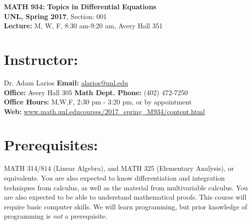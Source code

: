 \documentclass[margin]{res}
\theoremstyle{plain}
\theoremstyle{definition}
\theoremstyle{remark}
\begin{document}
\begin{center}
   \textbf{MATH 934:} 
   \textbf{Topics in Differential Equations}\\
   \textbf{UNL, Spring 2017}, Section: 001%
    \\
   \textbf{Lecture:} M, W, F, 8:30 am-9:20 am, Avery Hall 351\\
\end{center}
%
\vspace{-0.2in}
%
\begin{resume}
\section{Instructor:} Dr. Adam Larios 
\hfill \textbf{Email:} 
\url{alarios@unl.edu}
\\
\textbf{Office:} Avery Hall 305
\hfill
\textbf{Math Dept. Phone:} (402) 472-7250
\\
\textbf{Office Hours:} M,W,F, 2:30 pm - 3:20 pm, or by appointment
\hfill
\\
\textbf{Web:} \url{www.math.unl.educourses/2017_spring_M934/content.html}



 \section{Prerequisites:} MATH 314/814 (Linear Algebra), and MATH 325 (Elementary Analysis), or equivalents.  You are also expected to know differentiation and integration techniques from calculus, as well as the material from multivariable calculus.   You are also expected to be able to understand mathematical proofs.  This course will require basic computer skills.  We will learn programming, but prior knowledge of programming is \textit{not} a prerequisite.
 
 
 

\end{resume}
\end{document}
